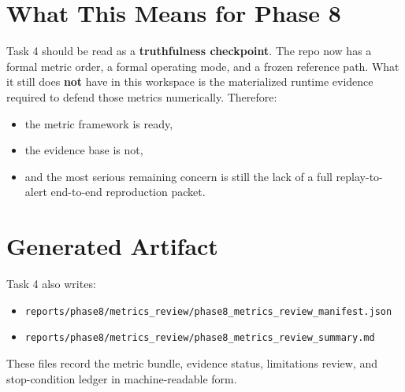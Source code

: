 \documentclass{article}
\begin{document}
\section*{What This Means for Phase 8}
Task 4 should be read as a \textbf{truthfulness checkpoint}. The repo now has a formal metric order, a formal operating mode, and a frozen reference path. What it still does \textbf{not} have in this workspace is the materialized runtime evidence required to defend those metrics numerically. Therefore:
\begin{itemize}
\item the metric framework is ready,
\item the evidence base is not,
\item and the most serious remaining concern is still the lack of a full replay-to-alert end-to-end reproduction packet.
\end{itemize}

\section*{Generated Artifact}
Task 4 also writes:
\begin{itemize}
\item \texttt{reports/phase8/metrics\_review/phase8\_metrics\_review\_manifest.json}
\item \texttt{reports/phase8/metrics\_review/phase8\_metrics\_review\_summary.md}
\end{itemize}

These files record the metric bundle, evidence status, limitations review, and stop-condition ledger in machine-readable form.
\end{document}
